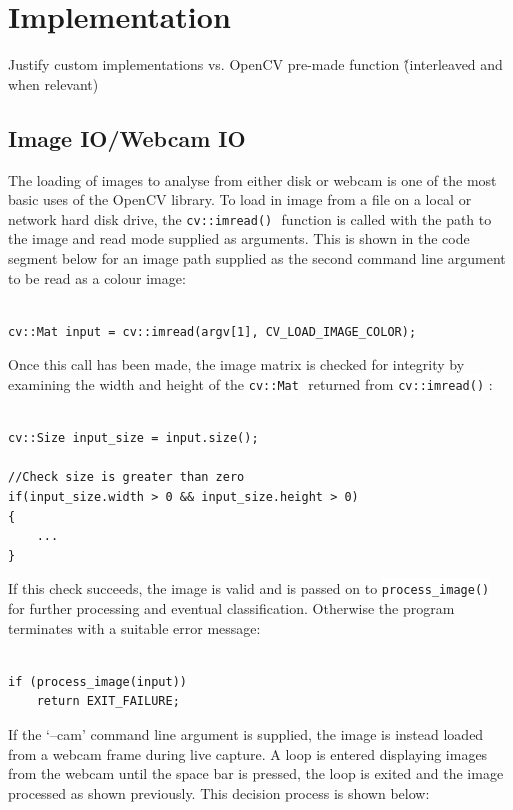 \documentclass[a4paper,12pt,notitlepage]{article}
\newcommand{\code}[1]{\colorbox{white}{\lstinline[basicstyle=\ttfamily\color{black}]|#1|} }
\begin{document}
\section{Implementation}
	Justify custom implementations vs. OpenCV pre-made function
	\^(interleaved and when relevant)
	\subsection{Image IO/Webcam IO}
		The loading of images to analyse from either disk or webcam is one of the most basic uses of the OpenCV library. To load in image from a file on a local or network hard disk drive, the \code{cv::imread()} function is called with the path to the image and read mode supplied as arguments. This is shown in the code segment below for an image path supplied as the second command line argument to be read as a colour image:

		\begin{lstlisting}

cv::Mat input = cv::imread(argv[1], CV_LOAD_IMAGE_COLOR);
		\end{lstlisting}

		Once this call has been made, the image matrix is checked for integrity by examining the width and height of the \code{cv::Mat} returned from \code{cv::imread()}:

		\begin{lstlisting}

cv::Size input_size = input.size();

//Check size is greater than zero
if(input_size.width > 0 && input_size.height > 0)
{
	...
}
		\end{lstlisting}

		If this check succeeds, the image is valid and is passed on to \code{process_image()} for further processing and eventual classification. Otherwise the program terminates with a suitable error message:
		
		\begin{lstlisting}

if (process_image(input))
	return EXIT_FAILURE;
		\end{lstlisting}

		If the `--cam' command line argument is supplied, the image is instead loaded from a webcam frame during live capture. A loop is entered displaying images from the webcam until the space bar is pressed, the loop is exited and the image processed as shown previously. This decision process is shown below:
\end{document}
